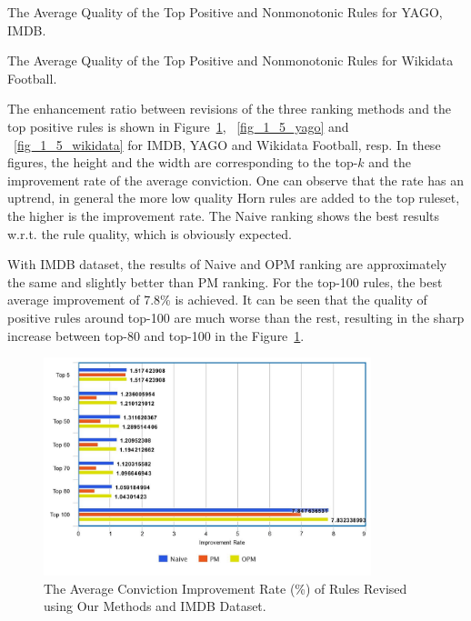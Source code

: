 \begin{table}[ht]
\centering
\footnotesize
\renewcommand*{\arraystretch}{1.07}
\centering

\smallskip
\caption{The Average Quality of the Top Positive and Nonmonotonic Rules for YAGO, IMDB.}
\label{tab:rules_quality1}
\end{table}

\begin{table}[ht]
\centering
\footnotesize
\renewcommand*{\arraystretch}{1.07}
\centering

\smallskip
\caption{The Average Quality of the Top Positive and Nonmonotonic Rules for Wikidata Football.}
\label{tab:rules_quality2}
\end{table}

The enhancement ratio between revisions of the three ranking methods and the top positive rules is shown in Figure~\ref{fig_1_5_imdb}, ~\ref{fig_1_5_yago} and ~\ref{fig_1_5_wikidata} for IMDB, YAGO and Wikidata Football, resp. In these figures, the height and the width are corresponding to the top-$k$ and the improvement rate of the average conviction. One can observe that the rate has an uptrend, in general the more low quality Horn rules are added to the top ruleset, the higher is the improvement rate. The Naive ranking shows the best results w.r.t. the rule quality, which is obviously expected.

With IMDB dataset, the results of Naive and OPM ranking are approximately the same and slightly better than PM ranking. For the top-100 rules, the best average improvement of 7.8\% is achieved. It can be seen that the quality of positive rules around top-100 are much worse than the rest, resulting in the sharp increase between top-80 and top-100 in the Figure~\ref{fig_1_5_imdb}.

\begin{figure}[ht]
\centering
\includegraphics[width=0.85\textwidth]{figures/table_1_5_imdb.jpeg}
\caption{The Average Conviction Improvement Rate (\%) of Rules Revised using Our Methods and IMDB Dataset.}
\label{fig_1_5_imdb}
\end{figure}

